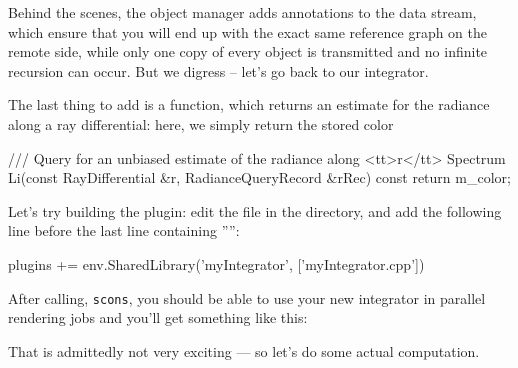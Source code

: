Behind the scenes, the object manager adds annotations to the data stream,
which ensure that you will end up with the exact same reference graph on the
remote side, while only one copy of every object is transmitted and no
infinite recursion can occur. But we digress -- let's go back to our integrator.
\vspace{3mm}

The last thing to add is a function, which returns an estimate for the
radiance along a ray differential: here, we simply return the stored color
\begin{cpp}
    /// Query for an unbiased estimate of the radiance along <tt>r</tt>
   Spectrum Li(const RayDifferential &r, RadianceQueryRecord &rRec) const {
       return m_color;
   }
\end{cpp}

Let's try building the plugin: edit the  file in the
 directory, and add the following line before the
last line containing '''':
\begin{cpp}
plugins += env.SharedLibrary('myIntegrator', ['myIntegrator.cpp'])
\end{cpp}
After calling, \texttt{scons}, you should be able to use your new integrator
in parallel rendering jobs and you'll get something like this:
\begin{center}
\end{center}
That is admittedly not very exciting --- so let's do some actual computation.
